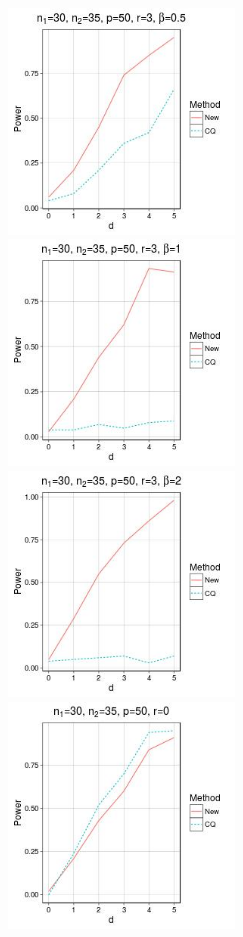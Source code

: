 \documentclass[review]{elsarticle}
\theoremstyle{plain}
\theoremstyle{definition}
\theoremstyle{remark}
\begin{document}
\begin{figure}
    \centering 
    \includegraphics[height=6cm]{code/fig1.jpeg}
    \includegraphics[height=6cm]{code/fig2.jpeg}
    \\
    \includegraphics[height=6cm]{code/fig3.jpeg}
    \includegraphics[height=6cm]{code/fig4.jpeg}

\end{figure}
\end{document}
